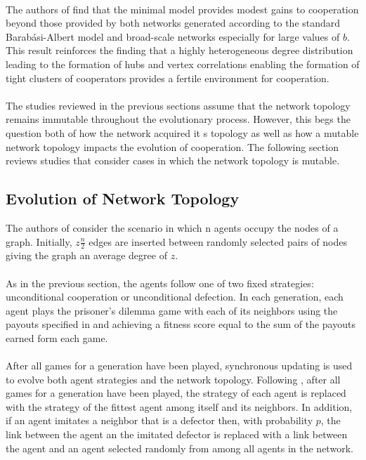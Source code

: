 \documentclass{article}
\begin{document}
	\paragraph{}The authors of \cite{Santos2006a} find that the minimal model provides modest gains to cooperation beyond those provided by both networks generated according to the standard Barab\'{a}si-Albert model and broad-scale networks especially for large values of $b$.  This result reinforces the finding that a highly heterogeneous degree distribution leading to the formation of hubs and vertex correlations enabling the formation of tight clusters of cooperators provides a fertile environment for cooperation.
	\paragraph{}The studies reviewed in the previous sections assume that the network topology remains immutable throughout the evolutionary process.  However, this begs the question both of how the network acquired it s topology as well as how a mutable network topology impacts the evolution of cooperation.  The following section reviews studies that consider cases in which the network topology is mutable.
	
	\subsection{Evolution of Network Topology}
	The authors of \cite{Eguiluz2005} consider the scenario in which n agents occupy the nodes of a graph.  Initially, $z\frac{n}{2}$ edges are inserted between randomly selected pairs of nodes giving the graph an average degree of $z$.
	\paragraph{}As in the previous section, the agents follow one of two fixed strategies: unconditional cooperation or unconditional defection.  In each generation, each agent plays the prisoner's dilemma game with each of its neighbors using the payouts specified in \cite{Nowak1992} and achieving a fitness score equal to the sum of the payouts earned form each game.
	\paragraph{}After all games for a generation have been played, synchronous updating is used to evolve both agent strategies and the network topology.  Following \cite{Nowak1992}, after all games for a generation have been played, the strategy of each agent is replaced with the strategy of the fittest agent among itself and its neighbors.  In addition, if an agent imitates a neighbor that is a defector then, with probability $p$, the link between the agent an the imitated defector is replaced with a link between the agent and an agent selected randomly from among all agents in the network.
\end{document}
